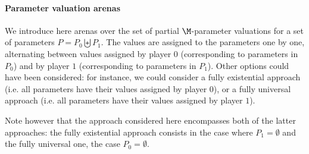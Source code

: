 \paragraph{Parameter valuation arenas}

We introduce here arenas over the set of partial $\M$-parameter valuations for a set of parameters
$P = P_0 \biguplus P_1$. The values are assigned to the parameters one by one, alternating between values assigned by player $0$ (corresponding to parameters in $P_0$) and by player $1$ (corresponding to parameters in $P_1$). Other options could have been considered: for instance, we could consider a fully existential approach 
(i.e. all parameters have their values assigned by player $0$), 
or a fully universal approach
(i.e. all parameters have their values assigned by player $1$). 

Note however that the approach considered here encompasses both of the latter approaches:
the fully existential approach consists in the case where $P_1 = \emptyset$ and
the fully universal one, the case $P_0 = \emptyset$.

